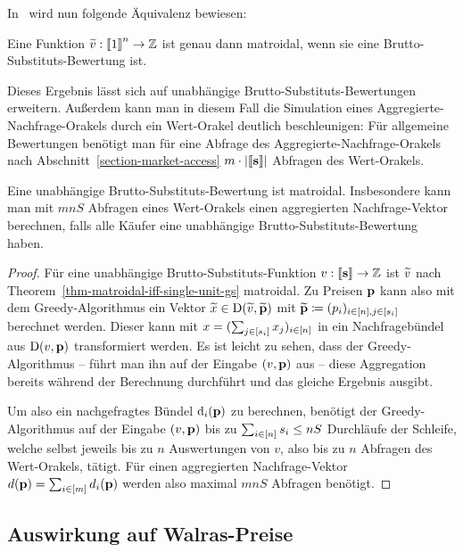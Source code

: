 In~\cite{PaesLeme2017} wird nun folgende Äquivalenz bewiesen:
\begin{theorem}\label{thm-matroidal-iff-single-unit-gs}
	Eine Funktion $\widetilde{v}:\left\llbracket 1 \right\rrbracket^n \rightarrow \mathbb{Z}$ ist genau dann matroidal, wenn sie eine Brutto-Substituts-Bewertung ist.
\end{theorem}
Dieses Ergebnis lässt sich auf unabhängige Brutto-Substituts-Bewertungen erweitern.
Außerdem kann man in diesem Fall die Simulation eines Aggregierte-Nachfrage-Orakels durch ein Wert-Orakel deutlich beschleunigen:
Für allgemeine Bewertungen benötigt man für eine Abfrage des Aggregierte-Nachfrage-Orakels nach Abschnitt~\ref{section-market-access} $m\cdot\left\lvert \left\llbracket \mathbf{s} \right\rrbracket \right\rvert$ Abfragen des Wert-Orakels.
\begin{korollar}\label{cor-indep-gs-matroidal}
	Eine unabhängige Brutto-Substituts-Bewertung ist matroidal.
	Insbesondere kann man mit $mnS$ Abfragen eines Wert-Orakels einen aggregierten  Nachfrage-Vektor berechnen, falls alle Käufer eine unabhängige Brutto-Substituts-Bewertung haben.
\end{korollar}
\begin{proof}
	Für eine unabhängige Brutto-Substituts-Funktion $v:\left\llbracket \mathbf{s} \right\rrbracket \rightarrow \mathbb{Z}$ ist $\widetilde{v}$ nach Theorem~\ref{thm-matroidal-iff-single-unit-gs} matroidal.
	Zu Preisen $\mathbf{p}$ kann also mit dem Greedy-Algorithmus ein Vektor $\widetilde{x}\in\operatorname{D}(\widetilde{v}, \widetilde{\mathbf{p}})$ mit $\widetilde{\mathbf{p}} \coloneqq (p_i)_{i\in\left[ n \right], j\in\left[ s_i \right]}$ berechnet werden.
	Dieser kann mit $x=(\sum_{j\in\left[ s_i \right]} x_j)_{i\in\left[ n \right]}$ in ein Nachfragebündel aus $\operatorname{D}(v, \mathbf{p})$ transformiert werden.
	Es ist leicht zu sehen, dass der Greedy-Algorithmus -- führt man ihn auf der Eingabe $(v,\mathbf{p})$ aus -- diese Aggregation bereits während der Berechnung durchführt und das gleiche Ergebnis ausgibt.
	
	Um also ein nachgefragtes Bündel $\operatorname{d}_i(\mathbf{p})$ zu berechnen, benötigt der Greedy-Algorithmus auf der Eingabe $(v, \mathbf{p})$ bis zu $\sum_{i\in\left[ n \right]} s_i \leq nS$ Durchläufe der Schleife, welche selbst jeweils bis zu $n$ Auswertungen von $v$, also bis zu $n$ Abfragen des Wert-Orakels, tätigt.
	Für einen aggregierten Nachfrage-Vektor $d(\mathbf{p}) = \sum_{i\in\left[ m \right]} d_i(\mathbf{p})$ werden also maximal $mnS$ Abfragen benötigt.
\end{proof}


\subsection{Auswirkung auf Walras-Preise}

